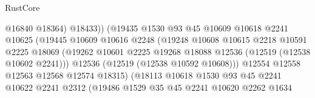 \begin{lexlean}{RustCore}
\begin{coremodule}
                                          @16840
                                          @18364)
                                        @18433))
                                    (@19435
                                      @1530
                                      @93
                                      @45
                                      @10609
                                      @10618
                                      @2241
                                      @10625
                                      (@19445
                                        @10609
                                        @10616
                                        @2248
                                        (@19248
                                          @10608
                                          @10615
                                          @2218
                                          @10591
                                          @2225
                                          @18069
                                          (@19262
                                            @10601
                                            @2225
                                            @19268
                                            @18088
                                            @12536
                                            (@12519 (@12538 @10602 @2241)))
                                          @12536
                                          (@12519 (@12538 @10592 @10608)))
                                        @12554
                                        @12558
                                        @12563
                                        @12568
                                        @12574
                                        @18315)
                                      (@18113
                                        @10618
                                        @1530
                                        @93
                                        @45
                                        @2241
                                        @10622
                                        @2241
                                        @2312
                                        (@19486
                                          @1529
                                          @35
                                          @45
                                          @2241
                                          @10620
                                          @2262
                                          @1634

\end{coremodule}
\end{lexlean}
